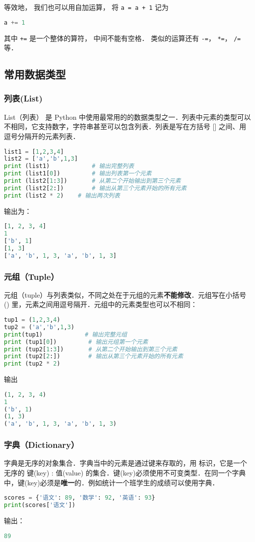 等效地， 我们也可以用自加运算， 将 \verb|a = a + 1| 记为
\begin{lstlisting}[language=python]
a += 1
\end{lstlisting}
其中 \verb|+=| 是一个整体的算符， 中间不能有空格． 类似的运算还有 \verb|-=|， \verb|*=|， \verb|/=| 等．

\subsection{常用数据类型}
\subsubsection{列表(List)}
List（列表） 是 Python 中使用最常用的的数据类型之一．列表中元素的类型可以不相同，它支持数字，字符串甚至可以包含列表．列表是写在方括号 [] 之间、用逗号分隔开的元素列表．
\begin{lstlisting}[language=python]
list1 = [1,2,3,4]
list2 = ['a','b',1,3]
print (list1)            # 输出完整列表
print (list1[0])         # 输出列表第一个元素
print (list2[1:3])       # 从第二个开始输出到第三个元素
print (list2[2:])        # 输出从第三个元素开始的所有元素
print (list2 * 2)    # 输出两次列表
\end{lstlisting}
输出为：
\begin{lstlisting}[language=python]
[1, 2, 3, 4]
1
['b', 1]
[1, 3]
['a', 'b', 1, 3, 'a', 'b', 1, 3]
\end{lstlisting}
\subsubsection{元组（Tuple）}
元组（tuple）与列表类似，不同之处在于元组的元素\textbf{不能修改}．元组写在小括号 () 里，元素之间用逗号隔开．元组中的元素类型也可以不相同：
\begin{lstlisting}[language=python]
tup1 = (1,2,3,4)
tup2 = ('a','b',1,3)
print(tup1)            # 输出完整元组
print (tup1[0])         # 输出元组第一个元素
print (tup2[1:3])       # 从第二个开始输出到第三个元素
print (tup2[2:])        # 输出从第三个元素开始的所有元素
print (tup2 * 2)
\end{lstlisting}
输出
\begin{lstlisting}[language=python]
(1, 2, 3, 4)
1
('b', 1)
(1, 3)
('a', 'b', 1, 3, 'a', 'b', 1, 3)

\end{lstlisting}
\subsubsection{字典（Dictionary）}
字典是无序的对象集合．字典当中的元素是通过键来存取的，用 { } 标识，它是一个无序的 键(key) : 值(value) 的集合．键(key)必须使用不可变类型．在同一个字典中，键(key)必须是\textbf{唯一}的．例如统计一个班学生的成绩可以使用字典．
\begin{lstlisting}[language=python]
scores = {'语文': 89, '数学': 92, '英语': 93}
print(scores['语文'])
\end{lstlisting}
输出：
\begin{lstlisting}[language=python]
89
\end{lstlisting}
